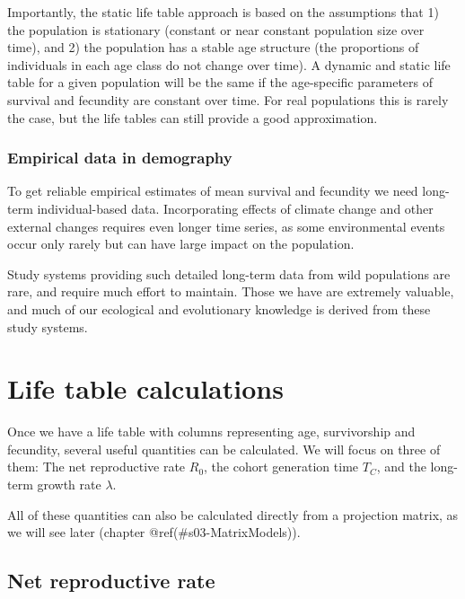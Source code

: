 \documentclass[
]{book}
\begin{document}
Importantly, the static life table approach is based on the assumptions that 1) the population is stationary (constant or near constant population size over time), and 2) the population has a stable age structure (the proportions of individuals in each age class do not change over time). A dynamic and static life table for a given population will be the same if the age-specific parameters of survival and fecundity are constant over time. For real populations this is rarely the case, but the life tables can still provide a good approximation.

\hypertarget{empirical-data-in-demography}{%
\subsubsection*{Empirical data in demography}\label{empirical-data-in-demography}}

To get reliable empirical estimates of mean survival and fecundity we need long-term individual-based data. Incorporating effects of climate change and other external changes requires even longer time series, as some environmental events occur only rarely but can have large impact on the population.

Study systems providing such detailed long-term data from wild populations are rare, and require much effort to maintain. Those we have are extremely valuable, and much of our ecological and evolutionary knowledge is derived from these study systems.

\hypertarget{life-table-calculations}{%
\section{Life table calculations}\label{life-table-calculations}}

Once we have a life table with columns representing age, survivorship and fecundity, several useful quantities can be calculated. We will focus on three of them: The net reproductive rate \(R_0\), the cohort generation time \(T_C\), and the long-term growth rate \(\lambda\).

All of these quantities can also be calculated directly from a projection matrix, as we will see later (chapter @ref(\#s03-MatrixModels)).

\hypertarget{net-reproductive-rate}{%
\subsection{Net reproductive rate}\label{net-reproductive-rate}}
\end{document}
